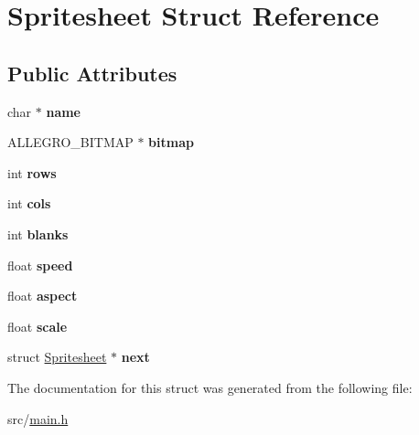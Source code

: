 \hypertarget{structSpritesheet}{\section{\-Spritesheet \-Struct \-Reference}
\label{structSpritesheet}
}
\subsection*{\-Public \-Attributes}
\begin{DoxyCompactItemize}
\item 
\hypertarget{structSpritesheet_a6788d53f825bd74cda7e50e75435befa}{char $\ast$ {\bfseries name}}\label{structSpritesheet_a6788d53f825bd74cda7e50e75435befa}

\item 
\hypertarget{structSpritesheet_ad31be6e59349586862e6a813ea139bcb}{\-A\-L\-L\-E\-G\-R\-O\-\_\-\-B\-I\-T\-M\-A\-P $\ast$ {\bfseries bitmap}}\label{structSpritesheet_ad31be6e59349586862e6a813ea139bcb}

\item 
\hypertarget{structSpritesheet_aeab321ce6cdd45cc8a5078e80480510e}{int {\bfseries rows}}\label{structSpritesheet_aeab321ce6cdd45cc8a5078e80480510e}

\item 
\hypertarget{structSpritesheet_a3d512755ce492a35e1816fe026cc37c9}{int {\bfseries cols}}\label{structSpritesheet_a3d512755ce492a35e1816fe026cc37c9}

\item 
\hypertarget{structSpritesheet_a5010b18959949b1c577078f94a810ef3}{int {\bfseries blanks}}\label{structSpritesheet_a5010b18959949b1c577078f94a810ef3}

\item 
\hypertarget{structSpritesheet_ad011770ca540de2bad85f0cb155c774b}{float {\bfseries speed}}\label{structSpritesheet_ad011770ca540de2bad85f0cb155c774b}

\item 
\hypertarget{structSpritesheet_a85c93c8d80227725374e1581c4c8e049}{float {\bfseries aspect}}\label{structSpritesheet_a85c93c8d80227725374e1581c4c8e049}

\item 
\hypertarget{structSpritesheet_ac46cf3d01609f66aae140e3b7d3d1109}{float {\bfseries scale}}\label{structSpritesheet_ac46cf3d01609f66aae140e3b7d3d1109}

\item 
\hypertarget{structSpritesheet_a671f77f759138aa2c852e5252b6daac5}{struct \hyperlink{structSpritesheet}{\-Spritesheet} $\ast$ {\bfseries next}}\label{structSpritesheet_a671f77f759138aa2c852e5252b6daac5}

\end{DoxyCompactItemize}


\-The documentation for this struct was generated from the following file\-:\begin{DoxyCompactItemize}
\item 
src/\hyperlink{main_8h}{main.\-h}\end{DoxyCompactItemize}
